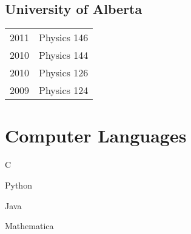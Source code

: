 \documentclass[letterpaper]{article}
\def\footerlink{}
\renewenvironment{itemize}{
  \begin{list}{}{
    \setlength{\leftmargin}{1.5em}
  }
}{
  \end{list}
}
\begin{document}
\subsection*{University of Alberta}
\begin{itemize}
\item \begin{tabular}{ll}
2011 & Physics 146 \\
2010 & Physics 144 \\
2010 & Physics 126 \\
2009 & Physics 124 \\
\end{tabular}
\end{itemize}

\section*{Computer Languages}
\begin{itemize}
\item C
\item Python
\item Java
\item Mathematica
\end{itemize}



\bigskip

\end{document}
